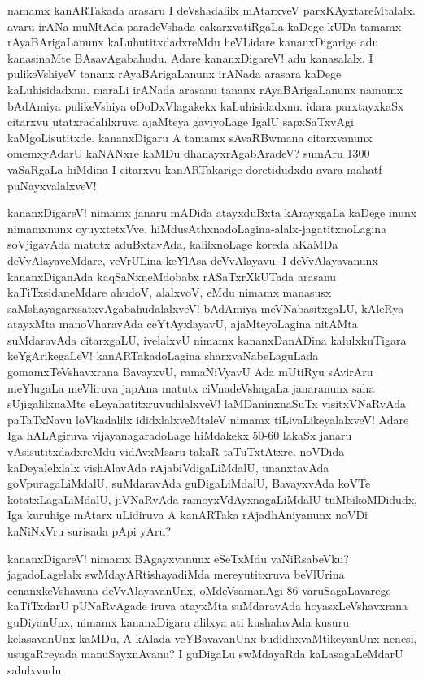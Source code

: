 \documentclass[11pt,a4size]{article}
\begin{document}
namamx kanARTakada arasaru I deVshadalilx mAtarxveV
parxKAyxtareMtalalx. avaru irANa muMtAda paradeVshada cakarxvatiRgaLa
kaDege kUDa tamamx rAyaBArigaLanunx kaLuhutitxdadxreMdu heVLidare
kananxDigarige adu kanasinaMte BAsavAgabahudu. Adare kananxDigareV!
adu kanasalalx. I pulikeVshiyeV tananx rAyaBArigaLanunx irANada
arasara kaDege kaLuhisidadxnu. maraLi irANada arasanu tananx
rAyaBArigaLanunx namamx bAdAmiya pulikeVshiya oDoDxVlagakekx
kaLuhisidadxnu. idara parxtayxkaSx citarxvu utatxradalilxruva ajaMteya
gaviyoLage IgalU sapxSaTxvAgi kaMgoLisutitxde. kananxDigaru A tamamx
sAvaRBwmana citarxvanunx omemxyAdarU kaNANxre kaMDu
dhanayxrAgabAradeV? sumAru 1300 vaSaRgaLa hiMdina I citarxvu
kanARTakarige doretidudxdu avara mahatf puNayxvalalxveV!

kananxDigareV! nimamx janaru mADida atayxduBxta kArayxgaLa kaDege
inunx nimamxnunx
oyuyxtetxVve. hiMdusAthxnadoLagina-alalx-jagatitxnoLagina soVjigavAda
matutx aduBxtavAda, kalilxnoLage koreda aKaMDa deVvAlayaveMdare,
veVrULina keYlAsa deVvAlayavu. I deVvAlayavanunx kananxDiganAda
kaqSaNxneMdobabx rASaTxrXkUTada arasanu kaTiTxsidaneMdare ahudoV,
alalxvoV, eMdu nimamx manasusx saMshayagarxsatxvAgabahudalalxveV!
bAdAmiya meVNabasitxgaLU, kAleRya atayxMta manoVharavAda
ceYtAyxlayavU, ajaMteyoLagina nitAMta suMdaravAda citarxgaLU,
ivelalxvU nimamx kananxDanADina kalulxkuTigara keYgArikegaLeV!
kanARTakadoLagina sharxvaNabeLaguLada gomamxTeVshavxrana BavayxvU,
ramaNiVyavU Ada mUtiRyu sAvirAru meYlugaLa meVliruva japAna matutx
ciVnadeVshagaLa janaranunx saha sUjigalilxnaMte
eLeyahatitxruvudilalxveV! laMDaninxnaSuTx visitxVNaRvAda paTaTxNavu
loVkadalilx ididxlalxveMtaleV nimamx tiLivaLikeyalalxveV! Adare Iga
hALAgiruva vijayanagaradoLage hiMdakekx 50-60 lakaSx janaru
vAsisutitxdadxreMdu vidAvxMsaru takaR taTuTxtAtxre. noVDida
kaDeyalelxlalx vishAlavAda rAjabiVdigaLiMdalU, unanxtavAda
goVpuragaLiMdalU, suMdaravAda guDigaLiMdalU, BavayxvAda koVTe
kotatxLagaLiMdalU, jiVNaRvAda ramoyxVdAyxnagaLiMdalU tuMbikoMDidudx,
Iga kuruhige mAtarx uLidiruva A kanARTaka rAjadhAniyanunx noVDi
kaNiNxVru surisada pApi yAru?

kananxDigareV! nimamx BAgayxvanunx eSeTxMdu vaNiRsabeVku?
jagadoLagelalx swMdayARtishayadiMda mereyutitxruva beVlUrina
cenanxkeVshavana deVvAlayavanUnx, oMdeVsamanAgi 86 varuSagaLavarege
kaTiTxdarU pUNaRvAgade iruva atayxMta suMdaravAda hoyasxLeVshavxrana
guDiyanUnx, nimamx kananxDigara alilxya ati kushalavAda kusuru
kelasavanUnx kaMDu, A kAlada veYBavavanUnx budidhxvaMtikeyanUnx
nenesi, usugaRreyada manuSayxnAvanu? I guDigaLu swMdayaRda
kaLasagaLeMdarU salulxvudu.
\end{document}
